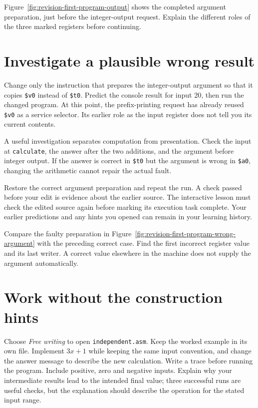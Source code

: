 Figure~\ref{fig:revision-first-program-output} shows the completed argument
preparation, just before the integer-output request. Explain the different roles
of the three marked registers before continuing.


\clearpage

\section{Investigate a plausible wrong result}

Change only the instruction that prepares the integer-output argument so that it
copies \texttt{\$v0} instead of \texttt{\$t0}. Predict the console result for
input 20, then run the changed program. At this point, the prefix-printing request
has already reused \texttt{\$v0} as a service selector. Its earlier role as the
input register does not tell you its current contents.

A useful investigation separates computation from presentation. Check the input
at \texttt{calculate}, the answer after the two additions, and the argument before
integer output. If the answer is correct in \texttt{\$t0} but the argument is wrong
in \texttt{\$a0}, changing the arithmetic cannot repair the actual fault.

Restore the correct argument preparation and repeat the run. A check passed before
your edit is evidence about the earlier source. The interactive lesson must check
the edited source again before marking its execution task complete. Your earlier
predictions and any hints you opened can remain in your learning history.

Compare the faulty preparation in
Figure~\ref{fig:revision-first-program-wrong-argument} with the preceding correct
case. Find the first incorrect register value and its last writer. A correct value
elsewhere in the machine does not supply the argument automatically.


\clearpage

\section{Work without the construction hints}

Choose \emph{Free writing} to open \texttt{independent.asm}. Keep the worked
example in its own file. Implement $3x+1$ while keeping the same input convention,
and change the answer message to describe the new calculation. Write a trace before running the program. Include positive, zero and negative inputs. Explain why your
intermediate results lead to the intended final value; three successful runs are
useful checks, but the explanation should describe the operation for the stated
input range.

